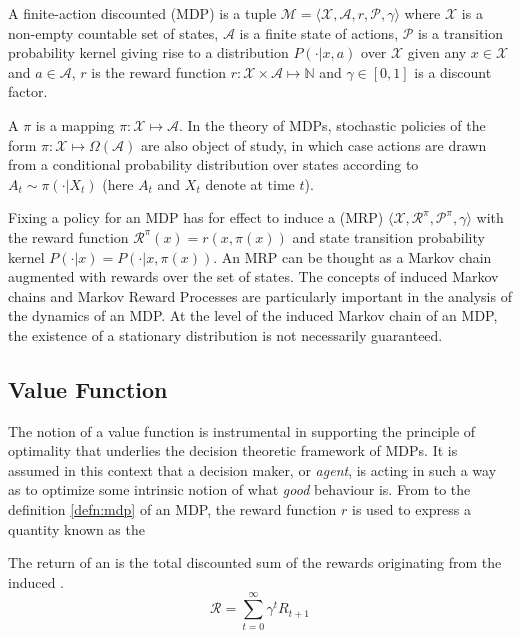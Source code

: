 \begin{defn}
\label{defn:mdp}
A finite-action discounted  (MDP) is a tuple
$\mathcal{M} = \langle \mathcal{X}, \mathcal{A}, r, \mathcal{P},\gamma \rangle$ where
$\mathcal{X}$ is a non-empty countable set of states, $\mathcal{A}$ is a finite state
of actions, $\mathcal{P}$ is a transition probability kernel giving rise to a distribution
$P(\cdot |x, a)$ over $\mathcal{X}$ given any $x \in \mathcal{X}$ and $a \in
\mathcal{A}$,  $r$ is the reward function $r: \mathcal{X} \times \mathcal{A} \mapsto
\mathbb{N}$ and $\gamma \in [0, 1]$ is a discount factor.
\end{defn}

A  $\pi$ is a mapping $\pi : \mathcal{X} \mapsto
\mathcal{A}$. In the theory of MDPs, stochastic policies of the form $\pi : \mathcal{X}
\mapsto \Omega(\mathcal{A})$ are also object of study, in which case actions are
drawn from a conditional probability distribution  over states according to $A_t \sim
\pi(\cdot | X_t)$ (here $A_t$ and $X_t$ denote \rvs at time $t$). 

Fixing a policy for an MDP has for effect to induce a 
(MRP) $\langle \mathcal{X}, \mathcal{R}^\pi, \mathcal{P}^\pi, \gamma \rangle$ with
the reward function $\mathcal{R}^\pi(x) = r(x, \pi(x))$ and state transition probability
kernel $P(\cdot | x) = P(\cdot | x, \pi(x))$. An MRP can be thought as a Markov chain
augmented with rewards over the set of states. The concepts of induced Markov
chains and Markov Reward Processes are particularly important in the analysis of the
dynamics of an MDP. At the level of the induced Markov chain of an MDP, the
existence of a stationary distribution is not necessarily guaranteed.

\subsection{Value Function}
The notion of a value function is instrumental in supporting the principle of optimality
that underlies the decision theoretic framework of MDPs. It is assumed in this context
that a decision maker, or \textit{agent}, is acting in such a way as to optimize some
intrinsic notion of what \textit{good} behaviour is. From to the definition
\ref{defn:mdp} of an MDP, the reward function $r$ is used to express a quantity
known as the 

\begin{defn}
The return of an \mdp is the total discounted sum of the rewards originating from
the induced \mrp.
\begin{equation}
\mathcal{R} = \sum_{t=0}^\infty \gamma^t R_{t+1} \label{eq:return}
\end{equation}
\end{defn}

